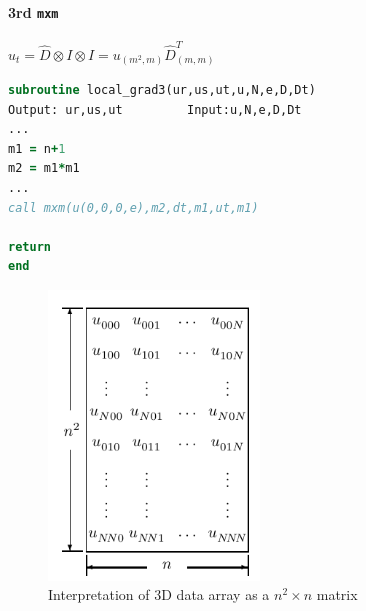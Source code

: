 \documentclass[
  a4paper,
  10pt]{article}
\begin{document}
\hypertarget{rd-mxm}{%
\paragraph{\texorpdfstring{3rd \texttt{mxm}}{3rd mxm}}\label{rd-mxm}}

\(u_{t} = \hat{D} \otimes I \otimes I = u_{(m^2, m)} \hat{D}^T_{(m, m)}\)

\begin{lstlisting}[language=Fortran]
subroutine local_grad3(ur,us,ut,u,N,e,D,Dt)
Output: ur,us,ut         Input:u,N,e,D,Dt
...
m1 = n+1
m2 = m1*m1
...
call mxm(u(0,0,0,e),m2,dt,m1,ut,m1)

return
end
\end{lstlisting}

\begin{figure}
\centering
\includegraphics[width=0.5\textwidth,height=\textheight]{figs/42abdb01633a6d4d696312b5360e89d4b3854b97.png}
\caption{Interpretation of 3D data array as a \(n^2 \times n\) matrix}
\end{figure}

  
\end{document}

